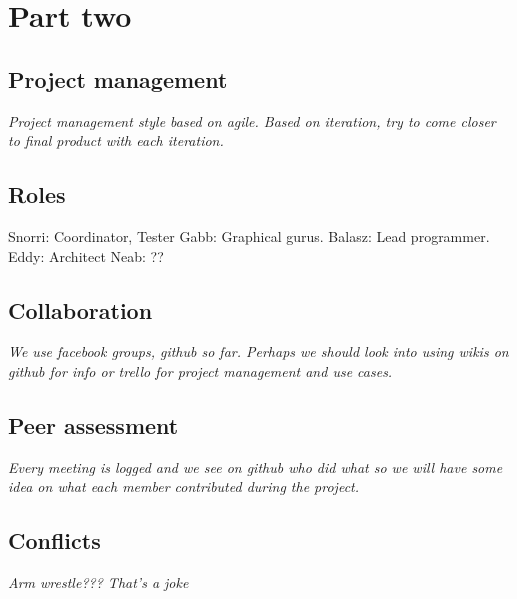 \documentclass[11pt]{article}
\begin{document}
\section{Part two}
\subsection{Project management}
\textit{Project management style based on agile. Based on iteration, try to come closer to final product with each iteration.}
\subsection{Roles}
 Snorri: Coordinator, Tester Gabb: Graphical gurus. Balasz: Lead programmer. Eddy: Architect Neab: ??
\subsection{Collaboration}
\textit{We use facebook groups, github so far. Perhaps we should look into using wikis on github for info or trello for project management and use cases.}
\subsection{Peer assessment}
\textit{Every meeting is logged and we see on github who did what so we will have some idea on what each member contributed during the project. }
\subsection{Conflicts}
\textit{Arm wrestle??? That's a joke}

\end{document}
